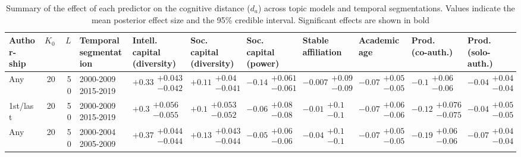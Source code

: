 \begin{table}[H]
\caption{Summary of the effect of each predictor on the cognitive distance ($d_a$) across topic models and temporal segmentations. Values indicate the mean posterior effect size and the 95\% credible interval. Significant effects are shown in bold}
\label{table:full_summary_disruption}
\renewcommand{\arraystretch}{2}\fontsize{6}{7}\selectfont\begin{tabular}{lrrllllllll}
\toprule
\makecell{Author-\\ ship} & $K_0$ & $L$ & \makecell{Temporal \\ segmentation} & \makecell{Intell. capital \\ (diversity)} & \makecell{Soc. capital \\ (diversity)} & \makecell{Soc. capital \\ (power)} & \makecell{Stable \\ affiliation} & \makecell{Academic \\ age} & \makecell{Prod. \\ (co-auth.)} & \makecell{Prod. \\ (solo-auth.)} \\
\midrule
Any & 20 & 50 & \makecell{2000-2009 \\ 2015-2019} & $\bm{+0.33}\substack{+0.043 \\ -0.042}$ & $\bm{+0.11}\substack{+0.04 \\ -0.041}$ & $\bm{-0.14}\substack{+0.061 \\ -0.061}$ & $-0.007\substack{+0.09 \\ -0.09}$ & $\bm{-0.07}\substack{+0.05 \\ -0.05}$ & $\bm{-0.1}\substack{+0.06 \\ -0.06}$ & $-0.04\substack{+0.04 \\ -0.04}$ \\
1st/last & 20 & 50 & \makecell{2000-2009 \\ 2015-2019} & $\bm{+0.3}\substack{+0.056 \\ -0.055}$ & $\bm{+0.1}\substack{+0.053 \\ -0.052}$ & $-0.06\substack{+0.08 \\ -0.08}$ & $-0.01\substack{+0.1 \\ -0.1}$ & $\bm{-0.07}\substack{+0.06 \\ -0.06}$ & $\bm{-0.12}\substack{+0.076 \\ -0.075}$ & $-0.04\substack{+0.05 \\ -0.05}$ \\
Any & 20 & 50 & \makecell{2000-2004 \\ 2005-2009} & $\bm{+0.37}\substack{+0.044 \\ -0.044}$ & $\bm{+0.13}\substack{+0.043 \\ -0.044}$ & $-0.05\substack{+0.06 \\ -0.06}$ & $-0.04\substack{+0.1 \\ -0.1}$ & $\bm{-0.07}\substack{+0.05 \\ -0.05}$ & $\bm{-0.19}\substack{+0.06 \\ -0.06}$ & $\bm{-0.07}\substack{+0.04 \\ -0.04}$ \\

\end{tabular}
\end{table}
